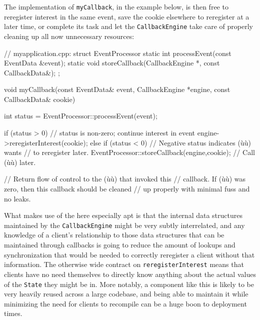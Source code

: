 \noindent The implementation of \lstinline!myCallback!, in the example below, is then
free to reregister interest in the same event, save the cookie elsewhere
to reregister at a later time, or complete its task and let the
\lstinline!CallbackEngine! take care of properly cleaning up all now
unnecessary resources:

\begin{emcppshiddenlisting}[emcppsbatch=e6]
// myapplication.cpp:
struct EventProcessor {
    static int processEvent(const EventData &event);
    static void storeCallback(CallbackEngine *, const CallbackData&);
};
\end{emcppshiddenlisting}
\begin{emcppslisting}[emcppsbatch=e6,emcppsoutputfile=myapplication.cpp]
void myCallback(const EventData&     event,
                CallbackEngine      *engine,
                const CallbackData&  cookie)
{
    int status = EventProcessor::processEvent(event);

    if (status > 0)  // status is non-zero; continue interest in event
    {
        engine->reregisterInterest(cookie);
    }
    else if (status < 0)  // Negative status indicates (ù{}ù) wants
                          // to reregister later.
    {
        EventProcessor::storeCallback(engine,cookie);
                          // Call (ù{}ù) later.
    }

    // Return flow of control to the (ù{}ù) that invoked this
    // callback.  If (ù{}ù) was zero, then this callback should be cleaned
    // up properly with minimal fuss and no leaks.
}
\end{emcppslisting}

\noindent What makes use of the  here especially apt is
that the internal data structures maintained by the
\lstinline!CallbackEngine! might be very subtly interrelated, and any
knowledge of a client's relationship to those data structures that can
be maintained through callbacks is going to reduce the amount of lookups
and synchronization that would be needed to correctly reregister a
client without that information. The otherwise wide contract on
\lstinline!reregisterInterest! means that clients have no need themselves
to directly know anything about the actual values of the \lstinline!State!
they might be in. More notably, a component like this is likely to be
very heavily reused across a large codebase, and being able to maintain
it while minimizing the need for clients to recompile can be a huge boon
to deployment times.

